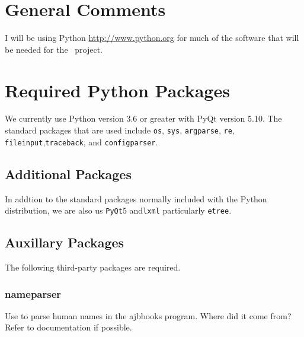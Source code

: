 
\section{General Comments}

I will be using Python \url{http://www.python.org} for much of the software
that will be needed for the \ProjectTitle\ project.

\section{Required Python Packages}

We currently use Python version 3.6 or greater with PyQt version 5.10.
The standard packages that are used include \texttt{os}, \texttt{sys},
\texttt{argparse}, \texttt{re}, \texttt{fileinput},\texttt{traceback},
and \texttt{configparser}.

\subsection{Additional Packages}

In addtion to the standard packages normally included with the Python
distribution, we are also us \texttt{PyQt}5 and\texttt{lxml}
particularly \texttt{etree}. 

\subsection{Auxillary Packages}
The following third-party packages are required.

\subsubsection{nameparser}

Use to parse human names in the ajbbooks program.  Where did it come
from? Refer to documentation if possible.

